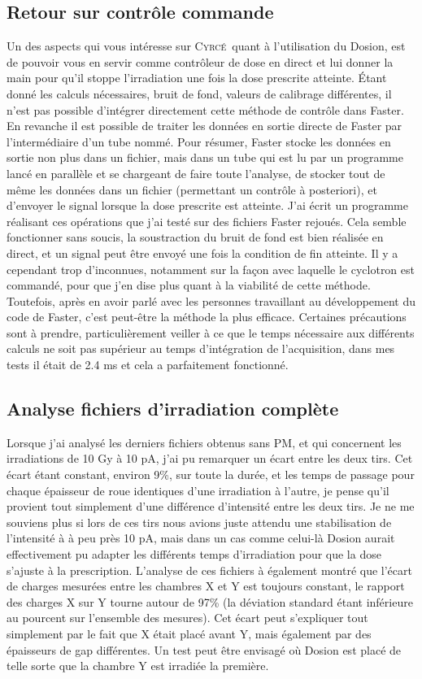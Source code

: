 \documentclass[a4paper,11pt]{article}
\newcommand{\cyrce}{\textsc{Cyrcé}}
\begin{document}
\subsection*{Retour sur contrôle commande}
Un des aspects qui vous intéresse sur \cyrce\ quant à l'utilisation du Dosion, est de pouvoir vous en servir comme contrôleur de dose en direct et lui donner la main pour qu'il stoppe l'irradiation une fois la dose prescrite atteinte.
Étant donné les calculs nécessaires, bruit de fond, valeurs de calibrage différentes, il n'est pas possible d'intégrer directement cette méthode de contrôle dans Faster. 
En revanche il est possible de traiter les données en sortie directe de Faster par l'intermédiaire d'un tube nommé. 
Pour résumer, Faster stocke les données en sortie non plus dans un fichier, mais dans un tube qui est lu par un programme lancé en parallèle et se chargeant de faire toute l'analyse, de stocker tout de même les données dans un fichier (permettant un contrôle à posteriori), et d'envoyer le signal lorsque la dose prescrite est atteinte.
J'ai écrit un programme réalisant ces opérations que j'ai testé sur des fichiers Faster rejoués. 
Cela semble fonctionner sans soucis, la soustraction du bruit de fond est bien réalisée en direct, et un signal peut être envoyé une fois la condition de fin atteinte.
Il y a cependant trop d'inconnues, notamment sur la façon avec laquelle le cyclotron est commandé, pour que j'en dise plus quant à la viabilité de cette méthode. 
Toutefois, après en avoir parlé avec les personnes travaillant au développement du code de Faster, c'est peut-être la méthode la plus efficace. 
Certaines précautions sont à prendre, particulièrement veiller à ce que le temps nécessaire aux différents calculs ne soit pas supérieur au temps d'intégration de l'acquisition, dans mes tests il était de 2.4 ms et cela a parfaitement fonctionné.

\subsection*{Analyse fichiers d'irradiation complète}
Lorsque j'ai analysé les derniers fichiers obtenus sans PM, et qui concernent les irradiations de 10 Gy à 10 pA, j'ai pu remarquer un écart entre les deux tirs.
Cet écart étant constant, environ 9\%, sur toute la durée, et les temps de passage pour chaque épaisseur de roue identiques d'une irradiation à l'autre, je pense qu'il provient tout simplement d'une différence d'intensité entre les deux tirs.
Je ne me souviens plus si lors de ces tirs nous avions juste attendu une stabilisation de l'intensité à à peu près 10 pA, mais dans un cas comme celui-là Dosion aurait effectivement pu adapter les différents temps d'irradiation pour que la dose s'ajuste à la prescription.
L'analyse de ces fichiers à également montré que l'écart de charges mesurées entre les chambres X et Y est toujours constant, le rapport des charges X sur Y tourne autour de 97\% (la déviation standard étant inférieure au pourcent sur l'ensemble des mesures).
Cet écart peut s'expliquer tout simplement par le fait que X était placé avant Y, mais également par des épaisseurs de gap différentes.
Un test peut être envisagé où Dosion est placé de telle sorte que la chambre Y est irradiée la première.
\end{document}
